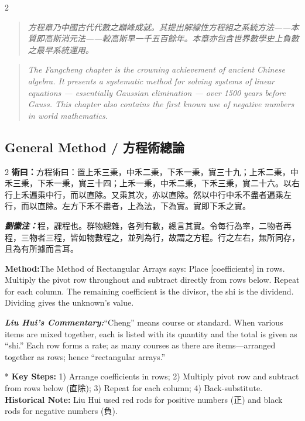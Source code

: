 \documentclass[11pt,a4paper]{article}
\newcommand{\cnshu}{\textcolor{cnlabelfg}{\textbf{術曰：}}}
\newcommand{\cnzhu}{\textcolor{commentarycolor}{\textit{\textbf{劉徽注：}}}}
\newcommand{\enshu}{\textcolor{enlabelfg}{\textbf{Method:}}}
\newcommand{\enzhu}{\textcolor{enlabelfg}{\textit{\textbf{Liu Hui's Commentary:}}}}
\newenvironment{mathdisplay}{\switchcolumn[0]*}{\switchcolumn[0]}
\begin{document}
\begin{paracol}{2}
\switchcolumn[0]
\begin{quote}\color{quotecolor}\small
\textit{方程章乃中國古代代數之巔峰成就。其提出解線性方程組之系統方法——本質即高斯消元法——較高斯早一千五百餘年。本章亦包含世界數學史上負數之最早系統運用。}
\end{quote}
\switchcolumn[1]
\begin{quote}\color{quotecolor}\small
\textit{The Fangcheng chapter is the crowning achievement of ancient Chinese algebra. It presents a systematic method for solving systems of linear equations --- essentially Gaussian elimination --- over 1500 years before Gauss. This chapter also contains the first known use of negative numbers in world mathematics.}
\end{quote}
\end{paracol}

\subsection*{General Method / 方程術總論}

\begin{paracol}{2}
\switchcolumn[0]
\cnshu 方程術曰：置上禾三秉，中禾二秉，下禾一秉，實三十九；上禾二秉，中禾三秉，下禾一秉，實三十四；上禾一秉，中禾二秉，下禾三秉，實二十六。以右行上禾遍乘中行，而以直除。又乘其次，亦以直除。然以中行中禾不盡者遍乘左行，而以直除。左方下禾不盡者，上為法，下為實。實即下禾之實。

\cnzhu 程，課程也。群物總雜，各列有數，總言其實。令每行為率，二物者再程，三物者三程，皆如物數程之，並列為行，故謂之方程。行之左右，無所同存，且為有所據而言耳。

\switchcolumn[1]
\enshu The Method of Rectangular Arrays says: Place [coefficients] in rows. Multiply the pivot row throughout and subtract directly from rows below. Repeat for each column. The remaining coefficient is the divisor, the shi is the dividend. Dividing gives the unknown's value.

\enzhu ``Cheng'' means course or standard. When various items are mixed together, each is listed with its quantity and the total is given as ``shi.'' Each row forms a rate; as many courses as there are items---arranged together as rows; hence ``rectangular arrays.''
\end{paracol}

\begin{mathdisplay}
\textbf{Key Steps:} 1) Arrange coefficients in rows; 2) Multiply pivot row and subtract from rows below (直除); 3) Repeat for each column; 4) Back-substitute.
\textbf{Historical Note:} Liu Hui used red rods for positive numbers (正) and black rods for negative numbers (負).
\end{mathdisplay}
\end{document}
